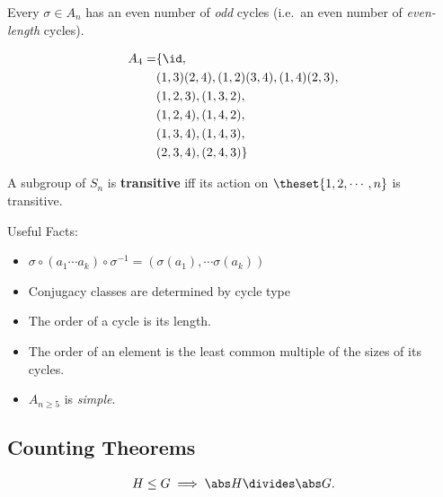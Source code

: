 \begin{corollary}

Every \(\sigma \in A_n\) has an even number of \emph{odd} cycles
(i.e.~an even number of \emph{even-length} cycles).

\end{corollary}

\begin{example}

\begin{align*}
A_4 =
&\{\id, \\
&(1,3)(2,4),
(1,2)(3,4),
(1,4)(2,3), \\
& (1,2,3),
(1,3,2), \\
& (1,2,4),
(1,4,2), \\
& (1,3,4),
(1,4,3), \\
& (2,3,4),
(2,4,3)\}
\end{align*}

\end{example}

\begin{definition}

A subgroup of \(S_n\) is \textbf{transitive} iff its action on
\(\theset{1, 2, \cdots, n}\) is transitive.

\end{definition}

Useful Facts:

\begin{itemize}
\tightlist
\item
  \(\sigma \circ (a_1 \cdots a_k)\circ \sigma^{-1} = (\sigma(a_1), \cdots \sigma(a_k))\)
\item
  Conjugacy classes are determined by cycle type
\item
  The order of a cycle is its length.
\item
  The order of an element is the least common multiple of the sizes of
  its cycles.
\item
  \(A_{n\geq 5}\) is \emph{simple}.
\end{itemize}

\hypertarget{counting-theorems}{%
\subsection{Counting Theorems}\label{counting-theorems}}

\begin{theorem}

\begin{align*}H \leq G \implies \abs H \divides \abs G.\end{align*}

\end{theorem}


